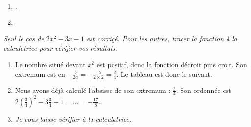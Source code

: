 \documentclass[11pt]{article}
\begin{document}
\newpage
\setcounter{exercice}{0}
\begin{exercice}~
  \begin{enumerate}
    \item
      .
    \item 
  \end{enumerate}
\end{exercice}

\begin{exercice}
  \emph{Seul le cas de $2x^2-3x-1$ est corrigé. Pour les autres, tracer la fonction à la calculatrice pour vérifier vos résultats.}
  \begin{enumerate}
    \item Le nombre situé devant $x^2$ est positif, donc la fonction décroit puis croit. Son extremum est en $-\frac{b}{2a}=-\frac{-3}{2\times2}=\frac{3}{4}$. Le tableau est donc le suivant.

      \hfill{}
    \item Nous avons déjà calculé l'absisse de son extremum : $\frac{3}{4}$. Son ordonnée est $2\left(\frac{3}{4}\right)^2-3\frac{3}{4}-1=\ldots=-\frac{17}8$.
    \item \emph{Je vous laisse vérifier à la calculatrice.}
  \end{enumerate}
\end{exercice}
\end{document}
